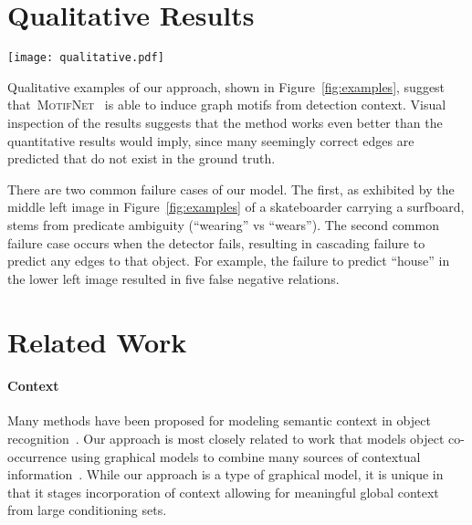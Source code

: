 \documentclass[10pt,twocolumn,letterpaper]{article}
\newcommand{\model}{\textsc{MotifNet}}
\begin{document}
\section{Qualitative Results}
\label{sec:qualitative}
\begin{figure*}[t]
    \vspace{-.3cm}
    \centering
    \texttt{[image: qualitative.pdf]}
    \caption{Qualitative examples from our model in the Scene Graph Detection setting. Green boxes are predicted and overlap with the ground truth, orange boxes are ground truth with no match. Green edges are true positives predicted by our model at the R@20 setting, orange edges are false negatives, and blue edges are false positives. Only predicted boxes that overlap with the ground truth are shown. }
    \vspace{-.4cm}
    \label{fig:examples}
\end{figure*}

Qualitative examples of our approach, shown in Figure~\ref{fig:examples}, suggest that~\model~ is able to induce graph motifs from detection context. Visual inspection of the results suggests that the method works even better than the quantitative results would imply, since many seemingly correct edges are predicted that do not exist in the ground truth.

There are two common failure cases of our model. The first, as exhibited by the middle left image in Figure~\ref{fig:examples} of a skateboarder carrying a surfboard, stems from predicate ambiguity (``wearing'' vs ``wears'').
The second common failure case occurs when the detector fails, resulting in cascading failure to predict any edges to that object.
For example, the failure to predict ``house'' in the lower left image resulted in five false negative relations.
\section{Related Work}
\label{sec:relation_work}
\paragraph{Context}%
Many methods have been proposed for modeling semantic context in object recognition~\cite{divvala2009empirical}. 
Our approach is most closely related to work that models object co-occurrence using graphical models to combine many sources of contextual information~\cite{rabinovich2007objects,galleguillos2010context,li2007,farhadi2010every}.
While our approach is a type of graphical model, it is unique in that it stages incorporation of context allowing for meaningful global context from large conditioning sets.
\end{document}
